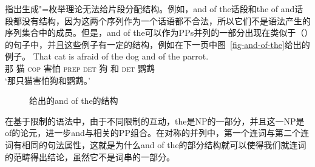 \mbox{}\citet[\S~3.2]{PS2001a}指出生成"=枚举理论无法给片段分配结构。例如，and of the话段和the of and话段都没有结构，因为这两个序列作为一个话语都不合法，所以它们不是语法产生的序列集合中的成员。但是，and of the可以作为PPs并列的一部分出现在类似于（）的句子中，并且这些例子有一定的结构，例如在下一页中图~\vref{fig-and-of-the}给出的例子。
\ea
\gll That cat is afraid of the dog and of the parrot.\\
	 那 猫 \textsc{cop} 害怕 \textsc{prep} \textsc{det} 狗 和 \textsc{det} 鹦鹉\\
\glt `那只猫害怕狗和鹦鹉。'
\z
\begin{figure}
\centering
{}
\caption{\label{fig-and-of-the}给出的and of the的结构}
\end{figure}%
在基于限制的语法中，由于不同限制的互动，the是NP的一部分，并且这一NP是of的论元，进一步and与相关的PP组合。在对称的并列中，第一个连词与第二个连词有相同的句法属性，这就是为什么and of the的部分结构就可以使得我们就连词的范畴得出结论，虽然它不是词串的一部分。

